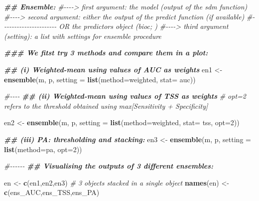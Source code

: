 \documentclass[
]{article}
\newenvironment{Shaded}{\begin{snugshade}}{\end{snugshade}}
\newcommand{\AttributeTok}[1]{\textcolor[rgb]{0.13,0.29,0.53}{#1}}
\newcommand{\CommentTok}[1]{\textcolor[rgb]{0.56,0.35,0.01}{\textit{#1}}}
\newcommand{\DecValTok}[1]{\textcolor[rgb]{0.00,0.00,0.81}{#1}}
\newcommand{\DocumentationTok}[1]{\textcolor[rgb]{0.56,0.35,0.01}{\textbf{\textit{#1}}}}
\newcommand{\FunctionTok}[1]{\textcolor[rgb]{0.13,0.29,0.53}{\textbf{#1}}}
\newcommand{\NormalTok}[1]{#1}
\newcommand{\OtherTok}[1]{\textcolor[rgb]{0.56,0.35,0.01}{#1}}
\newcommand{\StringTok}[1]{\textcolor[rgb]{0.31,0.60,0.02}{#1}}
\begin{document}
\begin{Shaded}
\begin{Highlighting}[]
\DocumentationTok{\#\# Ensemble:}
\CommentTok{\#{-}{-}{-}{-}\textgreater{} first argument: the model (output of the sdm function)}
\CommentTok{\#{-}{-}{-}{-}\textgreater{}  second argument: either the output of the predict function (if available)}
\CommentTok{\#{-}{-}{-}{-}{-}{-}{-}{-}{-}{-}{-}{-}{-}{-}{-}{-}{-}{-}{-}{-}{-}{-} OR the predictors object (bioc; )}
\CommentTok{\#{-}{-}{-}{-}\textgreater{} third argument (setting): a list with settings for ensemble procedure}

\DocumentationTok{\#\#\# We fitst try 3 methods and compare them in a plot:}

\DocumentationTok{\#\# (i) Weighted{-}mean using values of AUC as weights}
\NormalTok{en1 }\OtherTok{\textless{}{-}} \FunctionTok{ensemble}\NormalTok{(m, p, }\AttributeTok{setting =} \FunctionTok{list}\NormalTok{(}\AttributeTok{method=}\StringTok{\textquotesingle{}weighted\textquotesingle{}}\NormalTok{, }\AttributeTok{stat=} \StringTok{\textquotesingle{}auc\textquotesingle{}}\NormalTok{))}

\CommentTok{\#{-}{-}{-}{-}}
\DocumentationTok{\#\# (ii) Weighted{-}mean using values of TSS as weights }
\CommentTok{\# opt=2 refers to the threshold obtained using max[Sensitivity + Specificity]}

\NormalTok{en2 }\OtherTok{\textless{}{-}} \FunctionTok{ensemble}\NormalTok{(m, p, }\AttributeTok{setting =} \FunctionTok{list}\NormalTok{(}\AttributeTok{method=}\StringTok{\textquotesingle{}weighted\textquotesingle{}}\NormalTok{, }\AttributeTok{stat=} \StringTok{\textquotesingle{}tss\textquotesingle{}}\NormalTok{, }\AttributeTok{opt=}\DecValTok{2}\NormalTok{))}

\DocumentationTok{\#\# (iii) PA: thresholding and stacking:}
\NormalTok{en3 }\OtherTok{\textless{}{-}} \FunctionTok{ensemble}\NormalTok{(m, p, }\AttributeTok{setting =} \FunctionTok{list}\NormalTok{(}\AttributeTok{method=}\StringTok{\textquotesingle{}pa\textquotesingle{}}\NormalTok{, }\AttributeTok{opt=}\DecValTok{2}\NormalTok{))}

\CommentTok{\#{-}{-}{-}{-}{-}{-} }
\DocumentationTok{\#\# Visualising the outputs of 3 different ensembles:}


\NormalTok{en }\OtherTok{\textless{}{-}} \FunctionTok{c}\NormalTok{(en1,en2,en3) }\CommentTok{\# 3 objects stacked in a single object}
\FunctionTok{names}\NormalTok{(en) }\OtherTok{\textless{}{-}} \FunctionTok{c}\NormalTok{(}\StringTok{\textquotesingle{}ens\_AUC\textquotesingle{}}\NormalTok{,}\StringTok{\textquotesingle{}ens\_TSS\textquotesingle{}}\NormalTok{,}\StringTok{\textquotesingle{}ens\_PA\textquotesingle{}}\NormalTok{)}


\end{Highlighting}
\end{Shaded}
\end{document}
